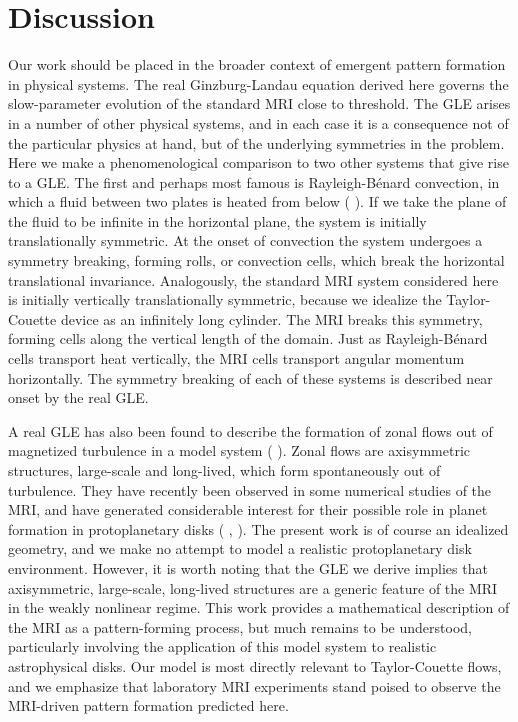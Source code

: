 \documentclass{emulateapj}
\newcommand{\citei}[1]{\citeauthor{#1} \citeyear{#1}}
\begin{document}
\section{Discussion}
\label{sec:discussion}
Our work should be placed in the broader context of emergent pattern formation in physical systems. The real Ginzburg-Landau equation derived here governs the slow-parameter evolution of the standard MRI close to threshold. The GLE arises in a number of other physical systems, and in each case it is a consequence not of the particular physics at hand, but of the underlying symmetries in the problem. Here we make a phenomenological comparison to two other systems that give rise to a GLE. The first and perhaps most famous is Rayleigh-B\'enard convection, in which a fluid between two plates is heated from below (\citei{Newell:1969wr}). If we take the plane of the fluid to be infinite in the horizontal plane, the system is initially translationally symmetric. %
At the onset of convection the system undergoes a symmetry breaking, forming rolls, or convection cells, which break the horizontal translational invariance. Analogously, the standard MRI system considered here is initially vertically translationally symmetric, because we idealize the Taylor-Couette device as an infinitely long cylinder. The MRI breaks this symmetry, forming cells along the vertical length of the domain. Just as Rayleigh-B\'enard cells transport heat vertically, the MRI cells transport angular momentum horizontally. The symmetry breaking of each of these systems is described near onset by the real GLE. 

A real GLE has also been found to describe the formation of zonal flows out of magnetized turbulence in a model system (\citei{Parker:2013hy}). Zonal flows are axisymmetric structures, large-scale and long-lived, which form spontaneously out of turbulence. They have recently been observed in some numerical studies of the MRI, and have generated considerable interest for their possible role in planet formation in protoplanetary disks (\citei{Johansen:2009uj}, \citei{Kunz:2013}). The present work is of course an idealized geometry, and we make no attempt to model a realistic protoplanetary disk environment. However, it is worth noting that the GLE we derive implies that axisymmetric, large-scale, long-lived structures are a generic feature of the MRI in the weakly nonlinear regime. This work provides a mathematical description of the MRI as a pattern-forming process, but much remains to be understood, particularly involving the application of this model system to realistic astrophysical disks. Our model is most directly relevant to Taylor-Couette flows, and we emphasize that laboratory MRI experiments stand poised to observe the MRI-driven pattern formation predicted here. 
\end{document}
